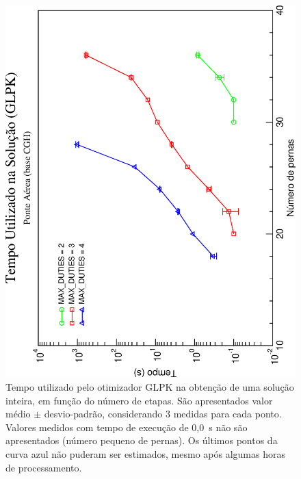 \documentclass[12pt,a4paper]{article}
\begin{document}
\begin{figure}[htb]
	\begin{center}
		\includegraphics[scale=0.45,angle=-90]{fig/glpk_solution_time.eps}
		\caption{Tempo utilizado pelo otimizador GLPK na obtenção de uma solução inteira, em função do 
		número de etapas. São apresentados valor médio $\pm$ desvio-padrão, considerando 3 medidas para 
		cada ponto. Valores medidos com tempo de execução de 0,0~s não são apresentados (número pequeno 
		de pernas). Os últimos pontos da curva azul não puderam ser estimados, mesmo após algumas horas 
		de processamento.}
		\label{fig:glpk}
	\end{center}
\end{figure}
\end{document}
